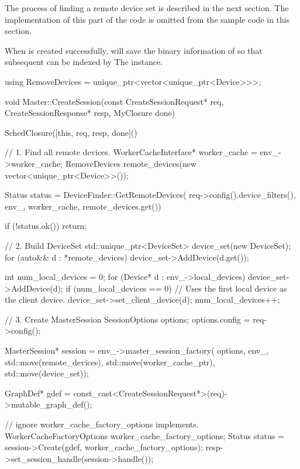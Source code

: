 \begin{content}
\begin{remark}
The process of finding a remote device set is described in the next section. The implementation of this part of the code is omitted from the sample code in this section.
\end{remark}

When  is created successfully,  will save the binary information of  so that subsequent  can be indexed by  The  instance.

\begin{leftbar}
\begin{c++}
using RemoveDevices = unique_ptr<vector<unique_ptr<Device>>>;

void Master::CreateSession(const CreateSessionRequest* req,
                           CreateSessionResponse* resp, MyClosure done) {
  SchedClosure([this, req, resp, done]() {
    // 1. Find all remote devices. 
    WorkerCacheInterface* worker_cache = env_->worker_cache;
    RemoveDevices remote_devices(new vector<unique_ptr<Device>>());

    Status status = DeviceFinder::GetRemoteDevices(
        req->config().device_filters(), env_,
        worker_cache, remote_devices.get())

    if (!status.ok()) return;

    // 2. Build DeviceSet
    std::unique_ptr<DeviceSet> device_set(new DeviceSet);
    for (auto&& d : *remote_devices) {
      device_set->AddDevice(d.get());
    }

    int num_local_devices = 0;
    for (Device* d : env_->local_devices) {
      device_set->AddDevice(d);
      if (num_local_devices == 0) {
        // Uses the first local device as the client device.
        device_set->set_client_device(d);
      }
      num_local_devices++;
    }

    // 3. Create MasterSession
    SessionOptions options;
    options.config = req->config();
    
    MasterSession* session = env_->master_session_factory(
        options, env_, std::move(remote_devices), 
        std::move(worker_cache_ptr), std::move(device_set));

    GraphDef* gdef =
        const_cast<CreateSessionRequest*>(req)->mutable_graph_def();
    
    // ignore worker\_cache\_factory\_options implements.
    WorkerCacheFactoryOptions worker_cache_factory_options;
    Status status = session->Create(gdef, worker_cache_factory_options);
    resp->set_session_handle(session->handle());
    
}}
\end{c++}
\end{leftbar}
\end{content}
